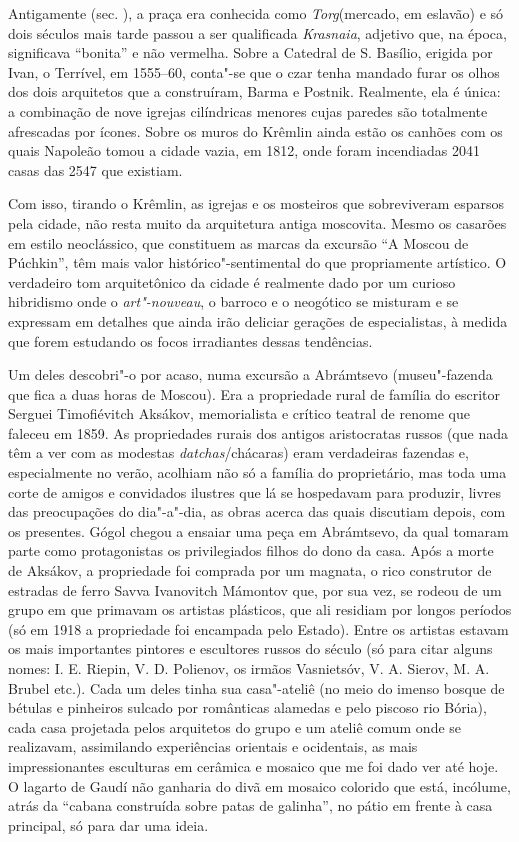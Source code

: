 Antigamente (sec. ), a praça era conhecida como \emph{Torg}(mercado,
em eslavão) e só dois séculos mais tarde passou a ser qualificada
\emph{Krasnaia}, adjetivo que, na época, significava ``bonita'' e não
vermelha. Sobre a Catedral de S. Basílio, erigida por Ivan, o Terrível, em
1555--60, conta"-se que o czar tenha mandado furar os olhos dos dois
arquitetos que a construíram, Barma e Postnik. Realmente, ela é única: a
combinação de nove igrejas cilíndricas menores cujas paredes são
totalmente afrescadas por ícones. Sobre os muros do Krêmlin ainda estão
os canhões com os quais Napoleão tomou a cidade vazia, em 1812, onde
foram incendiadas 2041 casas das 2547 que existiam.

Com isso, tirando o Krêmlin, as igrejas e os mosteiros que sobreviveram
esparsos pela cidade, não resta muito da arquitetura antiga moscovita.
Mesmo os casarões em estilo neoclássico, que constituem as marcas da
excursão ``A Moscou de Púchkin'', têm mais valor histórico"-sentimental
do que propriamente artístico. O verdadeiro tom arquitetônico da cidade
é realmente dado por um curioso hibridismo onde o \emph{art"-nouveau}, o
barroco e o neogótico se misturam e se expressam em detalhes que ainda
irão deliciar gerações de especialistas, à medida que forem estudando os
focos irradiantes dessas tendências.

Um deles descobri"-o por acaso, numa excursão a Abrámtsevo (museu"-fazenda
que fica a duas horas de Moscou). Era a propriedade rural de família do
escritor Serguei Timofiévitch Aksákov, memorialista e crítico teatral de
renome que faleceu em 1859. As propriedades rurais dos antigos
aristocratas russos (que nada têm a ver com as modestas
\emph{datchas}/chácaras) eram verdadeiras fazendas e, especialmente no
verão, acolhiam não só a família do proprietário, mas toda uma corte de
amigos e convidados ilustres que lá se hospedavam para produzir, livres
das preocupações do dia"-a"-dia, as obras acerca das quais discutiam
depois, com os presentes. Gógol chegou a ensaiar uma peça em Abrámtsevo,
da qual tomaram parte como protagonistas os privilegiados filhos do dono
da casa. Após a morte de Aksákov, a propriedade foi comprada por um
magnata, o rico construtor de estradas de ferro Savva Ivanovitch
Mámontov que, por sua vez, se rodeou de um grupo em que primavam os
artistas plásticos, que ali residiam por longos períodos (só em 1918 a
propriedade foi encampada pelo Estado). Entre os artistas estavam os
mais importantes pintores e escultores russos do século (só para citar
alguns nomes: I. E. Riepin, V. D. Polienov, os irmãos Vasnietsóv, V. A.
Sierov, M. A. Brubel etc.). Cada um deles tinha sua casa"-ateliê (no meio
do imenso bosque de bétulas e pinheiros sulcado por românticas alamedas
e pelo piscoso rio Bória), cada casa projetada pelos arquitetos do grupo
e um ateliê comum onde se realizavam, assimilando experiências orientais
e ocidentais, as mais impressionantes esculturas em cerâmica e mosaico
que me foi dado ver até hoje. O lagarto de Gaudí não ganharia do divã em
mosaico colorido que está, incólume, atrás da ``cabana construída sobre
patas de galinha'', no pátio em frente à casa principal, só para dar uma
ideia.

